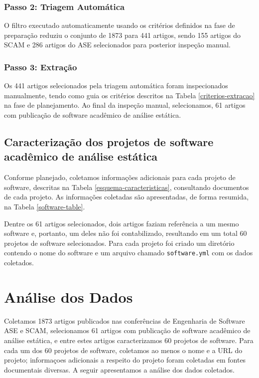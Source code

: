 \subsubsection{Passo 2: Triagem Automática}

O filtro executado automaticamente usando os critérios definidos na fase de
preparação reduziu o conjunto de 1873 para 441 artigos, sendo 155 artigos do SCAM e
286 artigos do ASE selecionados para posterior inspeção manual.

\subsubsection{Passo 3: Extração}

Os 441 artigos selecionados pela triagem automática foram inspecionados manualmente, tendo como guia
os critérios descritos na Tabela \ref{criterios-extracao} na fase de
planejamento. Ao final da inspeção manual, selecionamos, 61 artigos com publicação de
software acadêmico de análise estática.

\subsection{Caracterização dos projetos de software acadêmico de análise estática}

Conforme planejado, coletamos informações adicionais 
para cada projeto de software, descritas na Tabela
\ref{esquema-caracteristicas}, consultando
documentos de cada projeto. As informações coletadas são apresentadas, de forma
resumida, na Tabela \ref{software-table}.



Dentre os 61 artigos selecionados, dois artigos faziam referência a um mesmo software e,
portanto, um deles não foi contabilizado, 
resultando em um total 60 projetos de software selecionados. Para cada projeto foi criado um
diretório contendo o nome do software e um arquivo chamado
\texttt{software.yml} com os dados coletados.


\section{Análise dos Dados} \label{estudo1:analise} %

Coletamos 1873 artigos publicados nas conferências de Engenharia de Software
ASE e SCAM, selecionamos 61 artigos com publicação de software acadêmico de
análise estática, e entre estes artigos caracterizamos 60 projetos de software.
Para cada um dos 60 projetos de software, coletamos ao menos o nome e a URL do projeto;
informaçoes adicionais a respeito do projeto foram coletadas em fontes documentais diversas.
A seguir apresentamos a análise dos dados coletados.

